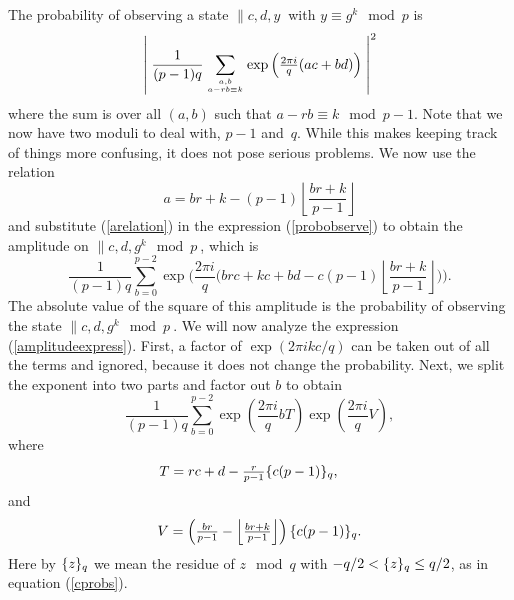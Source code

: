 The probability of observing a state $\|c,d,y\>$ with 
$y \equiv g^k \mod{p}$ is
\begin{equation}
\left| \; \frac{1}{(p-1)q}\sum_{{a,b}\atop{a-rb \equiv k}}
\exp\left({\textstyle \frac{2\pi i}{q} } (ac+bd)\right) \;
\right|^2
\label{probobserve}
\end{equation}
where the sum is over all
$(a,b)$ such that $a-rb \equiv k \mod{p-1}$.
Note that we now have two moduli to deal with, $p-1$ and~$q$.  While this
makes keeping track of things more confusing, it does not pose serious
problems.
We now use the relation
\begin{equation}
a = br + k - (p-1) \left\lfloor{\textstyle\frac{br+k}{p-1}}\right\rfloor
\label{arelation}
\end{equation}
and substitute (\ref{arelation}) in the expression (\ref{probobserve})
to obtain the amplitude
on $\|c,d,g^k\mod{p}\>$, which is
\begin{equation}
{\frac{1}{(p-1)q}}
\sum_{b=0}^{p-2}
\exp\Big(\textstyle\frac{2\pi i}{q} \big(brc+kc+bd-c(p-1)\left\lfloor
{\textstyle\frac{br+k}{p-1}}\right\rfloor\big)\Big).
\label{amplitudeexpress}
\end{equation}
The absolute value of the square of this amplitude is the probability
of observing the state $\|c,d,g^k\mod{p}\>$.
We will now analyze the expression 
(\ref{amplitudeexpress}).  First, a factor of 
$\exp(2\pi i k c/q)$ can be taken out of all the terms and ignored, 
because it does not change the probability.  Next, we split the
exponent into two parts and factor out $b$ to obtain
\begin{equation}
\frac{1}{(p-1)q}\sum_{b=0}^{p-2}
\textstyle
\exp\left(\frac{2\pi i}{q} 
bT\right)
\exp\left(\frac{2\pi i}{q} 
V\right),
\label{bigeq}
\end{equation}
where
\begin{equation}
T = \textstyle  {rc+d-\frac{r}{p-1}{\{c(p-1)\}_{q}}},\!\phantom{pen}
\end{equation}
and
\begin{equation}
V = \textstyle{\left(\frac{br}{p-1}-
\left\lfloor\frac{br+k}{p-1}\right\rfloor\right){\{c(p-1)\}_{q}}}.
\end{equation}
Here by ${\{z\}_{q}}$ we mean the residue of $z \mod q$ with
$-q/2 < {\{z\}_{q}} \leq q/2$, as in equation (\ref{cprobs}).


